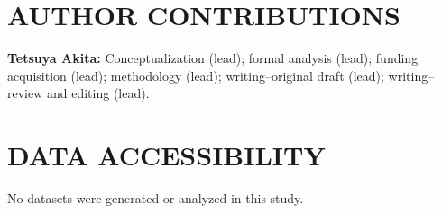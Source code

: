 \documentclass[12pt, English]{article}
\begin{document}
\begin{spacing}{1.9}
\section*{AUTHOR CONTRIBUTIONS}
{\bf Tetsuya Akita:} Conceptualization (lead); formal analysis (lead); funding acquisition (lead); methodology (lead); writing--original draft (lead); writing--review and editing (lead).

\section*{DATA ACCESSIBILITY}
No datasets were generated or analyzed in this study.




\clearpage


\end{spacing}
\end{document}
